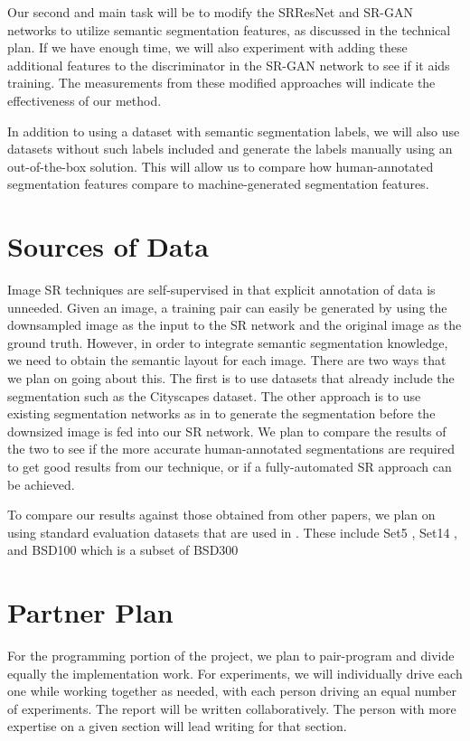 \documentclass[10pt,twocolumn,letterpaper]{article}
\begin{document}
Our second and main task will be to modify the SRResNet and SR-GAN networks to
utilize semantic segmentation features, as discussed in the technical plan. If
we have enough time, we will also experiment with adding these additional
features to the discriminator in the SR-GAN network to see if it aids training.
The measurements from these modified approaches will indicate the effectiveness
of our method.

In addition to using a dataset with semantic segmentation labels, we will also
use datasets without such labels included and generate the labels manually
using an out-of-the-box solution. This will allow us to compare how
human-annotated segmentation features compare to machine-generated segmentation
features.


\section{Sources of Data}
Image SR techniques are self-supervised in that explicit annotation of data is
unneeded. Given an image, a training pair can easily be generated by using the
downsampled image as the input to the SR network and the original image as the
ground truth. However, in order to integrate semantic segmentation knowledge,
we need to obtain the semantic layout for each image. There are two ways that we
plan on going about this. The first is to use datasets that already include
the segmentation such as the Cityscapes \cite{Cityscapes} dataset. The other
approach is to use existing segmentation networks as in
\cite{FullyConvolutionalSS} to generate the segmentation before the downsized
image is fed into our SR network. We plan to compare the results of the two to
see if the more accurate human-annotated segmentations are required to get good
results from our technique, or if a fully-automated SR approach can be achieved.

To compare our results against those obtained from other papers, we plan on
using standard evaluation datasets that are used in \cite{SRGAN}. These include
Set5 \cite{Set5}, Set14 \cite{Set14}, and BSD100 which is a subset of
BSD300 \cite{BSD300}


\section{Partner Plan}
For the programming portion of the project, we plan to pair-program and
divide equally the implementation work. For experiments, we will individually
drive each one while working together as needed, with each person driving an
equal number of experiments. The report will be written collaboratively. The
person with more expertise on a given section will lead writing for that
section.
\end{document}
